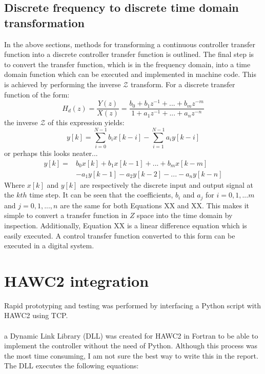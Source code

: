 \subsection{Discrete frequency to discrete time domain transformation}
In the above sections, methods for transforming a continuous controller transfer function into a discrete controller transfer function is outlined. The final step is to convert the transfer function, which is in the frequency domain, into a time domain function which can be executed and implemented in machine code. This is achieved by performing the inverse $\mathcal{Z}$ transform. For a discrete transfer function of the form:
\begin{equation}
    H_d(z) = \frac{Y(z)}{X(z)} = \frac{b_0 + b_1z^{-1} + ... + b_mz^{-m}}{1 + a_1z^{-1} + ... + a_nz^{-n}}
\end{equation}
the inverse $\mathcal{Z}$ of this expression yields:
\begin{equation}
    y[k] = \sum\limits_{i=0}^{N-1}b_ix[k-i] - \sum\limits_{i=1}^{N-1}a_iy[k-i]
\end{equation}
or perhaps this looks neater...
\begin{align}
y[k] =& b_0x[k] + b_1x[k-1] +  ... + b_mx[k-m] \\
&- a_1y[k-1] - a_2y[k-2] -  ... - a_ny[k-n]
\end{align}
Where $x[k]$ and $y[k]$ are respectively the discrete input and output signal at the $kth$ time step. It can be seen that the coefficients, $b_i$ and $a_j$ for $i= 0, 1, ... m$ and $j=0, 1, ..., n$ are the same for both Equations XX and XX. This makes it simple to convert a transfer function in $Z$ space into the time domain by inspection. Additionally, Equation XX is a linear difference equation which is easily executed. A control transfer function converted to this form can be executed in a digital system.  

\section{HAWC2 integration}
Rapid prototyping and testing was performed by interfacing a Python script with HAWC2 using TCP.
\\~\\
a Dynamic Link Library (DLL) was created for HAWC2 in Fortran to be able to implement the controller without the need of Python. Although this process was the most time consuming, I am not sure the best way to write this in the report. The DLL executes the following equations:






